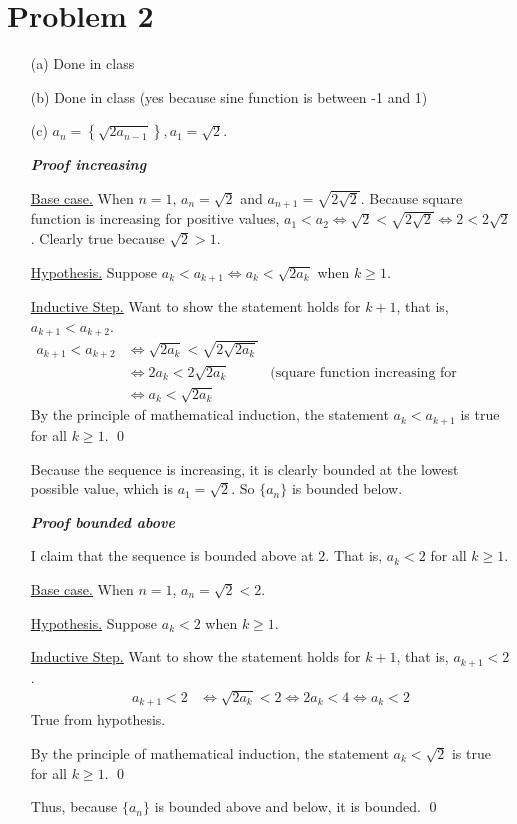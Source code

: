 \documentclass[preview, margin=0.6in]{standalone}
\newcommand*{\problem}[1]{\section*{Problem #1}}
\begin{document}
\problem{2}
\begin{itemize}
\item[(a)] Done in class
\item[(b)] Done in class (yes because sine function is between -1 and 1)

\item[(c)]
$\displaystyle a_n=\left\{\sqrt{2a_{n-1}}\right\},a_1=\sqrt{2}$.

\textbf{\textit{Proof increasing}}

\underline{Base case.} When $n=1$, $a_n=\sqrt{2}$ and $a_{n+1}=\sqrt{2 \sqrt{2}}$. Because square function is increasing for positive values, $a_1<a_2 \iff \sqrt{2} < \sqrt{2 \sqrt{2}} \iff 2 < 2 \sqrt{2}$. Clearly true because $ \sqrt{2}>1$.

\underline{Hypothesis.} Suppose $\displaystyle a_k<a_{k+1}\iff a_k< \sqrt{2a_k}$ when $k\geq1$.

\underline{Inductive Step.}
Want to show the statement holds for $k+1$, that is, $a_{k+1}<a_{k+2}$.
\begin{align*}
	a_{k+1}<a_{k+2}
	&\iff \sqrt{2a_k}< \sqrt{2 \sqrt{2 a_k}} \\
	&\iff 2a_k < 2 \sqrt{2a_k} & \text{(square function increasing for positive values)} \\
	&\iff a_k< \sqrt{2a_k}
\end{align*}
By the principle of mathematical induction, the statement $a_k<a_{k+1}$ is true for all $k\geq 1$. \qed

Because the sequence is increasing, it is clearly bounded at the lowest possible value, which is $a_1= \sqrt{2}$. So $\{a_n\}$ is bounded below.

\textbf{\textit{Proof bounded above}}

I claim that the sequence is bounded above at $2$. That is, $a_k<2$ for all $k\geq1$.

\underline{Base case.} When $n=1$, $a_n=\sqrt{2}<2$.

\underline{Hypothesis.} Suppose $\displaystyle a_k<2$ when $k\geq1$.

\underline{Inductive Step.}
Want to show the statement holds for $k+1$, that is, $a_{k+1}<2$.
\begin{align*}
	a_{k+1}<2
	&\iff \sqrt{2a_k}<2
	\iff 2a_k<4
	\iff a_k<2
\end{align*}
True from hypothesis.

By the principle of mathematical induction, the statement $a_k<\sqrt{2}$ is true for all $k\geq 1$. \qed

Thus, because $\{a_n\}$ is bounded above and below, it is bounded. \qed

\end{itemize}
\end{document}
